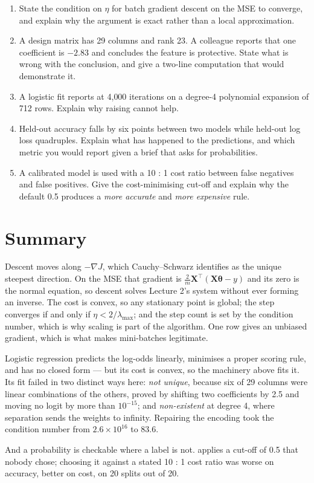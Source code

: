 \documentclass[11pt,a4paper]{article}
\begin{document}
\begin{enumerate}[leftmargin=1.6em,itemsep=4pt]
  \item State the condition on $\eta$ for batch gradient descent on the MSE to
        converge, and explain why the argument is exact rather than a local
        approximation. \hfill \scope{[5]}
  \item A design matrix has 29 columns and rank 23. A colleague reports that
        one coefficient is $-2.83$ and concludes the feature is protective.
        State what is wrong with the conclusion, and give a two-line
        computation that would demonstrate it. \hfill \scope{[5]}
  \item A logistic fit reports  at 4{,}000 iterations
        on a degree-4 polynomial expansion of 712 rows. Explain why raising
         cannot help. \hfill \scope{[4]}
  \item Held-out accuracy falls by six points between two models while held-out
        log loss quadruples. Explain what has happened to the predictions, and
        which metric you would report given a brief that asks for
        probabilities. \hfill \scope{[4]}
  \item A calibrated model is used with a 10 : 1 cost ratio between false
        negatives and false positives. Give the cost-minimising cut-off and
        explain why the default 0.5 produces a \emph{more accurate} and
        \emph{more expensive} rule. \hfill \scope{[4]}
\end{enumerate}

\section*{Summary}

Descent moves along $-\nabla J$, which Cauchy--Schwarz identifies as the unique
steepest direction. On the MSE that gradient is
$\frac{2}{m}\mathbf{X}^{\intercal}(\mathbf{X}\boldsymbol\theta - y)$ and its
zero is the normal equation, so descent solves Lecture 2's system without ever
forming an inverse. The cost is convex, so any stationary point is global; the
step converges if and only if $\eta < 2/\lambda_{\max}$; and the step count is
set by the condition number, which is why scaling is part of the algorithm. One
row gives an unbiased gradient, which is what makes mini-batches legitimate.

Logistic regression predicts the log-odds linearly, minimises a proper scoring
rule, and has no closed form --- but its cost is convex, so the machinery above
fits it. Its fit failed in two distinct ways here: \emph{not unique}, because
six of 29 columns were linear combinations of the others, proved by shifting
two coefficients by 2.5 and moving no logit by more than $10^{-15}$; and
\emph{non-existent} at degree 4, where separation sends the weights to
infinity. Repairing the encoding took the condition number from
$2.6\times10^{16}$ to 83.6.

And a probability is checkable where a label is not.  applies
a cut-off of 0.5 that nobody chose; choosing it against a stated 10 : 1 cost
ratio was worse on accuracy, better on cost, on 20 splits out of 20.
\end{document}
